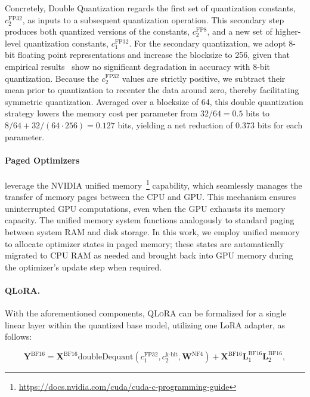 Concretely, Double Quantization regards the first set of quantization constants, $c_2^{\text{FP32}}$, as inputs to a subsequent quantization operation. This secondary step produces both quantized versions of the constants, $c_2^{\text{FP8}}$, and a new set of higher-level quantization constants, $c_1^{\text{FP32}}$. For the secondary quantization, we adopt 8-bit floating point representations and increase the blocksize to 256, given that empirical results~\citep{dettmers2022case} show no significant degradation in accuracy with 8-bit quantization. Because the $c_2^{\text{FP32}}$ values are strictly positive, we subtract their mean prior to quantization to recenter the data around zero, thereby facilitating symmetric quantization. Averaged over a blocksize of 64, this double quantization strategy lowers the memory cost per parameter from $32/64=0.5$ bits to $8/64 + 32/(64\cdot256) = 0.127$ bits, yielding a net reduction of 0.373 bits for each parameter.

\paragraph{Paged Optimizers} leverage the NVIDIA unified memory~\footnote{\tiny \url{https://docs.nvidia.com/cuda/cuda-c-programming-guide}} capability, which seamlessly manages the transfer of memory pages between the CPU and GPU. This mechanism ensures uninterrupted GPU computations, even when the GPU exhausts its memory capacity. The unified memory system functions analogously to standard paging between system RAM and disk storage. In this work, we employ unified memory to allocate optimizer states in paged memory; these states are automatically migrated to CPU RAM as needed and brought back into GPU memory during the optimizer’s update step when required.

\paragraph{\textsc{QLoRA}.} With the aforementioned components, \textsc{QLoRA} can be formalized for a single linear layer within the quantized base model, utilizing one LoRA adapter, as follows:

\begin{equation}
    \mathbf{Y}^{\text{BF16}} =  \mathbf{X}^{\text{BF16}} \text{doubleDequant}(c_1^{\text{FP32}}, c_2^{\text{k-bit}}, \mathbf{W}^{\text{NF4}}) + \mathbf{X}^{\text{BF16}}\mathbf{L}^{\text{BF16}}_1\mathbf{L}^{\text{BF16}}_2,
\end{equation}

